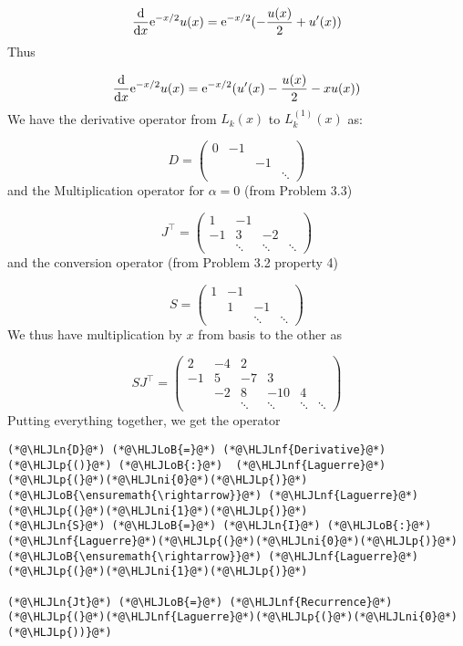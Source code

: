 \documentclass[12pt,landscape]{article}
\newcommand{\HLJLn}[1]{#1}
\newcommand{\HLJLnf}[1]{\textcolor[RGB]{66,102,213}{#1}}
\newcommand{\HLJLni}[1]{\textcolor[RGB]{59,151,46}{#1}}
\newcommand{\HLJLoB}[1]{\textcolor[RGB]{102,102,102}{\textbf{#1}}}
\newcommand{\HLJLp}[1]{#1}
\def\D{ {\rm d} }
\def\E{ {\rm e} }
\def\dx{\D x}
\begin{document}
{\[
{\D \over \dx} \E^{-x/2} u(x) =  \E^{-x/2} (-{u(x) \over 2} +u'(x))
\]
Thus

\[
{\D \over \dx} \E^{-x/2} u(x)  = \E^{-x/2} (u'(x) -{u(x) \over 2} - x u(x))
\]
We have the derivative operator from $L_k(x)$ to $L_k^{(1)}(x)$ as:

\[
D = \begin{pmatrix}
0 & -1 \\
  &&-1 \\
  &&&\ddots
\end{pmatrix}
\]
and the Multiplication operator for $\alpha = 0$ (from Problem 3.3)

\[
J^\top = \begin{pmatrix} 1 &-1\\
                        -1 & 3 &-2\\
                            &\ddots & \ddots & \ddots
                            \end{pmatrix}
\]
and the conversion operator (from Problem 3.2 property 4)

\[
S = \begin{pmatrix}
        1 & -1 \\ & 1 & -1 \\&&\ddots & \ddots
\end{pmatrix}
\]
We thus have multiplication by $x$ from basis to the other as

\[
S J^\top = \begin{pmatrix}
2 & -4 & 2 \\
-1 & 5 & -7 & 3 \\
& -2 & 8 & -10 & 4\\
&&\ddots&\ddots&\ddots&\ddots
\end{pmatrix}
\]
Putting everything together, we get the operator


\begin{lstlisting}
(*@\HLJLn{D}@*) (*@\HLJLoB{=}@*) (*@\HLJLnf{Derivative}@*)(*@\HLJLp{()}@*) (*@\HLJLoB{:}@*)  (*@\HLJLnf{Laguerre}@*)(*@\HLJLp{(}@*)(*@\HLJLni{0}@*)(*@\HLJLp{)}@*) (*@\HLJLoB{\ensuremath{\rightarrow}}@*) (*@\HLJLnf{Laguerre}@*)(*@\HLJLp{(}@*)(*@\HLJLni{1}@*)(*@\HLJLp{)}@*)
(*@\HLJLn{S}@*) (*@\HLJLoB{=}@*) (*@\HLJLn{I}@*) (*@\HLJLoB{:}@*) (*@\HLJLnf{Laguerre}@*)(*@\HLJLp{(}@*)(*@\HLJLni{0}@*)(*@\HLJLp{)}@*) (*@\HLJLoB{\ensuremath{\rightarrow}}@*) (*@\HLJLnf{Laguerre}@*)(*@\HLJLp{(}@*)(*@\HLJLni{1}@*)(*@\HLJLp{)}@*)

(*@\HLJLn{Jt}@*) (*@\HLJLoB{=}@*) (*@\HLJLnf{Recurrence}@*)(*@\HLJLp{(}@*)(*@\HLJLnf{Laguerre}@*)(*@\HLJLp{(}@*)(*@\HLJLni{0}@*)(*@\HLJLp{))}@*)


\end{lstlisting}}
\end{document}
